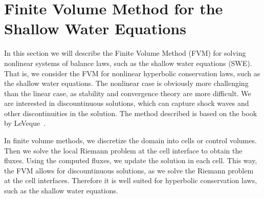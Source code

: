 \section{Finite Volume Method for the Shallow Water Equations}
In this section we will describe the Finite Volume Method (FVM) for solving nonlinear systems of balance laws, such as the shallow water equations (SWE).
That is, we consider the FVM for nonlinear hyperbolic conservation laws, such as the shallow water equations.
The nonlinear case is obviously more challenging than the linear case, as stability and convergence theory are more difficult.
We are interested in discountinuous solutions, which can capture shock waves and other discontinuities in the solution.
The method described is based on the book by LeVeque~\cite{LeVeque2002}.


In finite volume methods, we discretize the domain into cells or control volumes.
Then we solve the local Riemann problem at the cell interface to obtain the fluxes.
Using the computed fluxes, we update the solution in each cell.
This way, the FVM allows for discountinuous solutions, as we solve the Riemann problem at the cell interfaces.
Therefore it is well suited for hyperbolic conservation laws, such as the shallow water equations.



